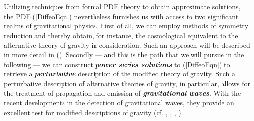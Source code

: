 \documentclass[%
preprint,
nofootinbib,
amsmath,amssymb,
aps,
prd,
floatfix,
]{revtex4-2}
\begin{document}
Utilizing techniques from formal PDE theory to obtain approximate solutions, the PDE (\ref{DiffeoEqn}) nevertheless furnishes us with access to two significant realms of gravitational physics. First of all, we can employ methods of symmetry reduction and thereby obtain, for instance, the cosmological equivalent to the alternative theory of gravity in consideration. Such an approach will be described in more detail in (\cite{NilsPHD}).
Secondly --- and this is the path that we will pursue in the following --- we can construct \textit{\textbf{power series solutions}} to (\ref{DiffeoEqn}) to retrieve a \textbf{\textit{perturbative}} description of the modified theory of gravity. Such a perturbative description of alternative theories of gravity, in particular, allows for the treatment of propagation and emission of \textit{\textbf{gravitational waves}}.
With the recent developments in the detection of gravitational waves, they provide an excellent test for modified descriptions of gravity (cf. \cite{2010PhRvD..81f4008Y}, \cite{2011PhRvD..83j4022B}, \cite{2017PhRvD..95j4027Z}, \cite{2013LRR....16....9Y} ).
\end{document}
